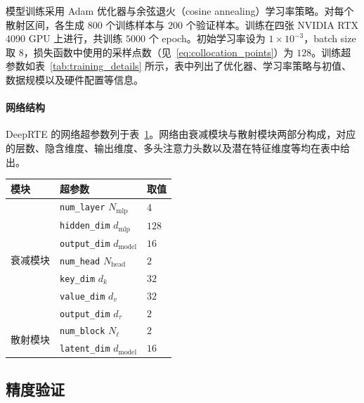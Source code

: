 模型训练采用 Adam 优化器与余弦退火（cosine annealing）学习率策略。对每个散射区间，各生成 $800$ 个训练样本与 $200$ 个验证样本。训练在四张 NVIDIA RTX 4090 GPU 上进行，共训练 $5000$ 个 epoch。初始学习率设为 $1 \times 10^{-3}$，batch size 取 $8$，损失函数中使用的采样点数（见~\eqref{eq:collocation_points}）为 $128$。训练超参数如表~\ref{tab:training_details} 所示，表中列出了优化器、学习率策略与初值、数据规模以及硬件配置等信息。

\paragraph{网络结构}
DeepRTE 的网络超参数列于表~\ref{tab:parameters}。网络由衰减模块与散射模块两部分构成，对应的层数、隐含维度、输出维度、多头注意力头数以及潜在特征维度等均在表中给出。

\begin{table}[!htp]
    \centering
    \begin{tabular}{lll}
        \toprule
        模块                    & 超参数                                     & 取值    \\ \midrule
        \multirow{7}{*}{衰减模块} & \texttt{num\_layer} $N_{\text{mlp}}$    & 4     \\
                              & \texttt{hidden\_dim} $d_{\text{mlp}}$   & $128$ \\
                              & \texttt{output\_dim} $d_{\text{model}}$ & $16$  \\
                              & \texttt{num\_head} $N_{\text{head}}$    & $2$   \\
                              & \texttt{key\_dim} $d_k$                 & $32$  \\
                              & \texttt{value\_dim} $d_v$               & $32$  \\
                              & \texttt{output\_dim} $d_{\tau}$         & $2$   \\
        \midrule
        \multirow{2}{*}{散射模块} & \texttt{num\_block} $N_{\ell}$          & $2$   \\
                              & \texttt{latent\_dim} $d_{\text{model}}$ & $16$  \\
        \bottomrule
    \end{tabular}
    \label{tab:parameters}
\end{table}

\subsection{精度验证}
\label{sec:acc}

